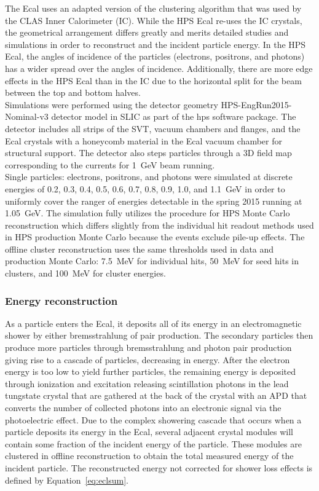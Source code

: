 \documentclass[12pt]{report}
\begin{document}
The Ecal uses an adapted version of the clustering algorithm that was used by the CLAS Inner Calorimeter (IC). While the HPS Ecal re-uses the IC crystals, the geometrical arrangement differs greatly and merits detailed studies and simulations in order to reconstruct and the incident particle energy. In the HPS Ecal, the angles of incidence of the particles (electrons, positrons, and photons) has a wider spread over the angles of incidence. Additionally, there are more edge effects in the HPS Ecal than in the IC due to the horizontal split for the beam between the top and bottom halves. \\
\indent Simulations were performed using the detector geometry HPS-EngRun2015-Nominal-v3 detector model in SLIC as part of the hps software package. The detector includes all strips of the SVT, vacuum chambers and flanges, and the Ecal crystals with a honeycomb material in the Ecal vacuum chamber for structural support. The detector also steps particles through a 3D field map corresponding to the currents for 1~GeV beam running. \\
\indent Single particles: electrons, positrons, and photons were simulated at discrete energies of 0.2, 0.3, 0.4, 0.5, 0.6, 0.7, 0.8,  0.9, 1.0, and 1.1~GeV in order to uniformly cover the ranger of energies detectable in the spring 2015 running at 1.05~GeV. The simulation fully utilizes the procedure for HPS Monte Carlo reconstruction which differs slightly from the individual hit readout methods used in HPS production Monte Carlo because the events exclude pile-up effects. The offline cluster reconstruction uses the same thresholds used in data and production Monte Carlo: 7.5~MeV for individual hits, 50~MeV for seed hits in clusters, and 100~MeV for cluster energies.\\

\subsubsection{Energy reconstruction}
\indent As a particle enters the Ecal, it deposits all of its energy in an electromagnetic shower by either bremsstrahlung of pair production. The secondary particles then produce more particles through bremsstrahlung and photon pair production giving rise to a cascade of particles, decreasing in energy. After the electron energy is too low to yield further particles, the remaining energy is deposited through ionization and excitation releasing scintillation photons in the lead tungstate crystal that are gathered at the back of the crystal with an APD that converts the number of collected photons into an electronic signal via the photoelectric effect. Due to the complex showering cascade that occurs when a particle deposits its energy in the Ecal, several adjacent crystal modules will contain some fraction of the incident energy of the particle. These modules are clustered in offline reconstruction to obtain the total measured energy of the incident particle. The reconstructed energy not corrected for shower loss effects is defined by Equation~\eqref{eq:eclsum}.
\end{document}
